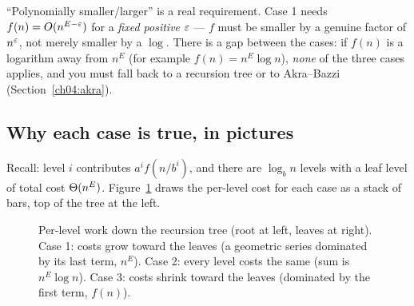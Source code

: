 \begin{trapbox}
``Polynomially smaller/larger'' is a real requirement. Case 1 needs
$f(n) = O(n^{E-\varepsilon})$ for a \emph{fixed positive} $\varepsilon$ --- $f$ must be smaller
by a genuine factor of $n^{\varepsilon}$, not merely smaller by a $\log$. There is a gap
between the cases: if $f(n)$ is a logarithm away from $n^{E}$ (for example
$f(n)=n^{E}\log n$), \emph{none} of the three cases applies, and you must fall back
to a recursion tree or to Akra--Bazzi (Section~\ref{ch04:akra}).
\end{trapbox}

\subsection{Why each case is true, in pictures}

Recall: level $i$ contributes $a^i f(n/b^i)$, and there are $\log_b n$ levels with
a leaf level of total cost $\Theta(n^{E})$. Figure~\ref{ch04:mastercases} draws the
per-level cost for each case as a stack of bars, top of the tree at the left.

\begin{figure}[H]
\centering
{}
\caption{Per-level work down the recursion tree (root at left, leaves at right).
Case 1: costs grow toward the leaves (a geometric series dominated by its last
term, $n^{E}$). Case 2: every level costs the same (sum is $n^{E}\log n$).
Case 3: costs shrink toward the leaves (dominated by the first term, $f(n)$).}
\label{ch04:mastercases}
\end{figure}

